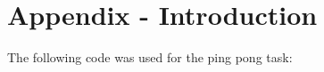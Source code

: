 \setcounter{section}{-1}
\section{Appendix - Introduction }
\label{app:pingpong}
The following code was used for the ping pong task:
